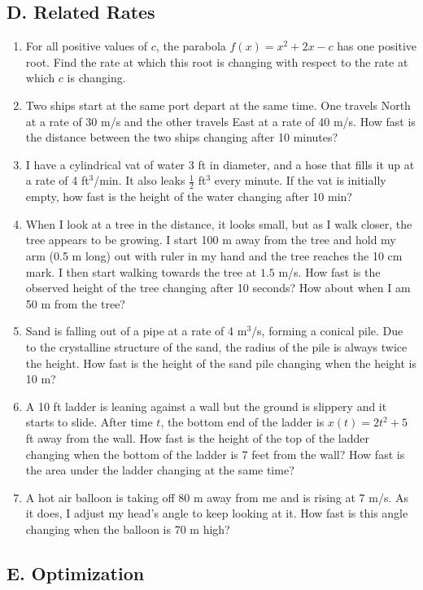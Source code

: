 \documentclass{article}
\begin{document}
\subsection*{D. Related Rates}

\begin{enumerate}
\item For all positive values of $c$, the parabola $f(x)=x^2+2x-c$ has one positive root. Find the rate at which this root is changing with respect to the rate at which $c$ is changing.
\item Two ships start at the same port depart at the same time. One travels North at a rate of 30 m/s and the other travels East at a rate of 40 m/s. How fast is the distance between the two ships changing after 10 minutes?
\item I have a cylindrical vat of water 3 ft in diameter, and a hose that fills it up at a rate of 4 ft$^3$/min. It also leaks $\frac{1}{2}$ ft$^3$ every minute. If the vat is initially empty, how fast is the height of the water changing after 10 min?
\item When I look at a tree in the distance, it looks small, but as I walk closer, the tree appears to be growing. I start 100 m away from the tree and hold my arm (0.5 m long) out with ruler in my hand and the tree reaches the 10 cm mark. I then start walking towards the tree at $1.5$ m/s. How fast is the observed height of the tree changing after 10 seconds? How about when I am 50 m from the tree?
\item Sand is falling out of a pipe at a rate of 4 m$^3$/s, forming a conical pile. Due to the crystalline structure of the sand, the radius of the pile is always twice the height. How fast is the height of the sand pile changing when the height is 10 m?
\item A 10 ft ladder is leaning against a wall but the ground is slippery and it starts to slide. After time $t$, the bottom end of the ladder is $x(t)=2t^2 + 5$ ft away from the wall. How fast is the height of the top of the ladder changing when the bottom of the ladder is 7 feet from the wall? How fast is the area under the ladder changing at the same time?
\item A hot air balloon is taking off 80 m away from me and is rising at 7 m/s. As it does, I adjust my head's angle to keep looking at it. How fast is this angle changing when the balloon is 70 m high?
\end{enumerate}



\subsection*{E. Optimization}
\end{document}
